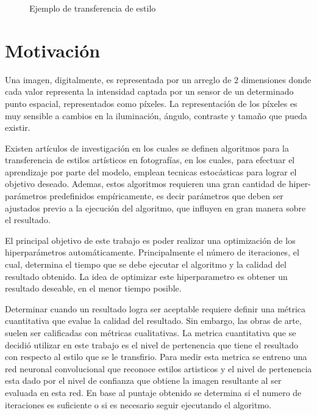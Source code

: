\documentclass[a4paper,11pt,spanish]{book}
\begin{document}
\begin{figure}[h]
	\caption{Ejemplo de transferencia de estilo}
	\label{fig:style_transfer_candy_tower}
      \end{figure}
  \section {Motivación}
    Una imagen, digitalmente, es representada por un arreglo de 2 dimensiones donde cada valor representa la intensidad captada por un sensor
    de un determinado punto espacial, representados como píxeles. La representación de los píxeles es muy sensible a cambios en la iluminación, ángulo, contraste y tamaño que pueda existir.

    Existen artículos de investigación en los cuales se definen algoritmos para la transferencia de estilos artísticos en fotografías, en los cuales, para efectuar el aprendizaje
    por parte del modelo, emplean tecnicas estocásticas para lograr el objetivo deseado. Ademas, estos algoritmos requieren una gran cantidad de hiper-parámetros predefinidos
    empíricamente, es decir parámetros que deben ser ajustados previo a la ejecución del algoritmo, que influyen en gran manera sobre el resultado.

    El principal objetivo de este trabajo es poder realizar una optimización de los hiperparámetros automáticamente. Principalmente el número de iteraciones, el cual, determina
    el tiempo que se debe ejecutar el algoritmo y la calidad del resultado obtenido. La idea de optimizar este hiperparametro es obtener un resultado deseable, en el menor tiempo posible.

    Determinar cuando un resultado logra ser aceptable requiere definir una métrica cuantitativa que evalue la calidad del resultado. Sin embargo, las obras de arte, suelen ser calificadas
    con métricas cualitativas. La metrica cuantitativa que se decidió utilizar en este trabajo es el nivel de pertenencia que tiene el resultado con respecto al estilo que se le transfirio.
    Para medir esta metrica se entreno una red neuronal convolucional que reconoce estilos artisticos y el nivel de pertenencia esta dado por el nivel de confianza que obtiene la imagen resultante
    al ser evaluada en esta red. En base al puntaje obtenido se determina si el numero de iteraciones es suficiente o si es necesario seguir ejecutando el algoritmo.
\end{document}
